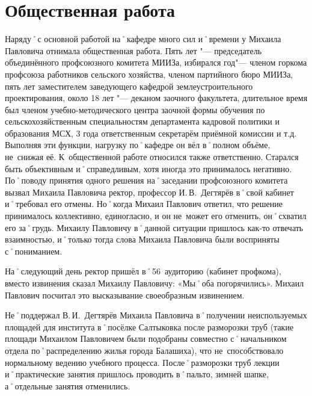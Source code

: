 \section*{Общественная работа}
\label{sec:socialWork}

Наряду˚с основной работой на˚кафедре много сил и˚времени у Михаила Павловича отнимала общественная работа. Пять лет "---  председатель объединённого профсоюзного комитета МИИЗа, избирался год"--- членом горкома профсоюза работников сельского хозяйства, членом партийного бюро МИИЗа, пять лет заместителем заведующего кафедрой землеустроительного проектирования, около 18 лет "--- деканом заочного факультета, длительное время был членом учебно-методического центра заочной формы обучения по сельскохозяйственным специальностям департамента кадровой политики и образования МСХ, 3 года ответственным секретарём приёмной комиссии и т.д. 
Выполняя эти функции,  нагрузку по˚кафедре он вёл в˚полном объёме, не~снижая её. К~общественной работе относился также ответственно. Старался быть объективным и˚справедливым, хотя иногда это принималось негативно. По˚поводу принятия одного решения на˚заседании профсоюзного комитета вызвал Михаила Павловича ректор, профессор И.\,В.~Дегтярёв в˚свой кабинет и˚требовал его отмены. Но˚когда Михаил Павлович ответил, что решение принималось коллективно, единогласно, и он не~может его отменить, он˚схватил его за˚грудь. Михаилу Павловичу в˚данной ситуации пришлось как-то отвечать взаимностью, и˚только тогда слова Михаила Павловича были восприняты с˚пониманием.

На˚следующий день ректор пришёл в˚56~аудиторию (кабинет профкома), вместо извинения сказал Михаилу Павловичу: «Мы˚оба погорячились». Михаил Павлович посчитал это высказывание своеобразным извинением.

Не˚поддержал В.\,И.~Дегтярёв Михаила Павловича в˚получении неиспользуемых площадей для института в˚посёлке Салтыковка после разморозки труб (такие площади Михаилом Павловичем были подобраны совместно с˚начальником отдела по˚распределению жилья города Балашиха), что не~способствовало нормальному ведению учебного процесса. После˚разморозки труб лекции и˚практические занятия пришлось проводить в˚пальто, зимней шапке, а˚отдельные занятия отменились.

